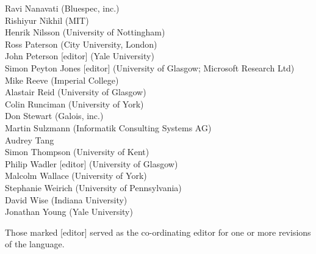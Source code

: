 \begin{center}
Ravi Nanavati (Bluespec, inc.) \\
Rishiyur Nikhil (MIT) \\
Henrik Nilsson (University of Nottingham) \\
Ross Paterson (City University, London) \\
John Peterson [editor] (Yale University) \\
Simon Peyton Jones [editor] (University of Glasgow; Microsoft Research Ltd) \\
Mike Reeve (Imperial College) \\
Alastair Reid (University of Glasgow) \\
Colin Runciman (University of York) \\
Don Stewart (Galois, inc.) \\
Martin Sulzmann (Informatik Consulting Systems AG) \\
Audrey Tang \\
Simon Thompson (University of Kent) \\
Philip Wadler [editor] (University of Glasgow) \\
Malcolm Wallace (University of York) \\
Stephanie Weirich (University of Pennsylvania) \\
David Wise (Indiana University) \\
Jonathan Young (Yale University)
\end{center}

Those marked [editor] served as the co-ordinating editor for one or more
revisions of the language.


